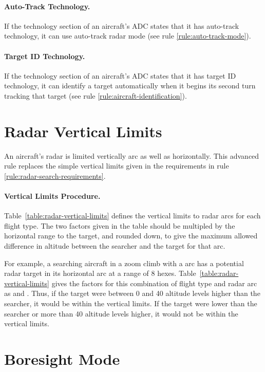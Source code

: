 {\begin{advancedrules}
\paragraph{Auto-Track Technology.}\label{rule:auto-track-technology} If the technology section of an aircraft’s ADC states that it has auto-track technology, it can use auto-track radar mode (see rule \ref{rule:auto-track-mode}).

\paragraph{Target ID Technology.}\label{rule:target-id-technology} If the technology section of an aircraft’s ADC states that it has target ID technology, it can identify a target automatically when it begins its second turn tracking that target (see rule \ref{rule:aircraft-identification}).

\section{Radar Vertical Limits}
\label{rule:radar-vertical-limits}

An aircraft's radar is limited vertically arc as well as horizontally. This advanced rule replaces the simple vertical limits given in the requirements in rule \ref{rule:radar-search-requirements}.

\paragraph{Vertical Limits Procedure.} Table~\ref{table:radar-vertical-limits} defines the vertical limits to radar arcs for each flight type. The two factors given in the table should be multipled by the horizontal range to the target, and rounded down, to give the maximum allowed difference in altitude between the searcher and the target for that arc.

For example, a searching aircraft in a zoom climb with a  arc has a potential radar target in its horizontal arc at a range of 8 hexes. Table~\ref{table:radar-vertical-limits} gives the factors for this combination of flight type and radar arc as  and . Thus, if the target were between 0 and 40 altitude levels higher than the searcher, it would be within the vertical limits. If the target were lower than the searcher or more than 40 altitude levels higher, it would not be within the vertical limits.

\section{Boresight Mode} 
\label{rule:boresight-mode}


\end{advancedrules}}
